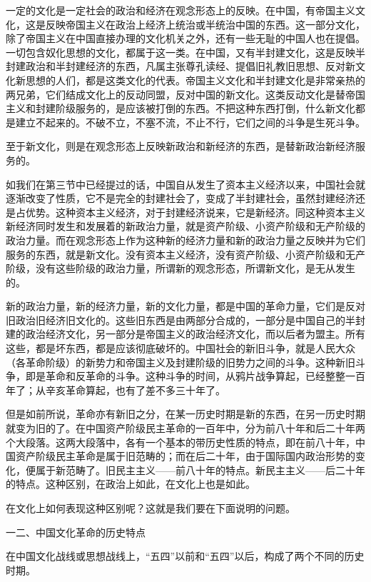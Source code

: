 \documentclass[UTF8, 12pt, a4paper]{ctexrep}
\begin{document}
一定的文化是一定社会的政治和经济在观念形态上的反映。在中国，有帝国主义文化，这是反映帝国主义在政治上经济上统治或半统治中国的东西。这一部分文化，除了帝国主义在中国直接办理的文化机关之外，还有一些无耻的中国人也在提倡。一切包含奴化思想的文化，都属于这一类。在中国，又有半封建文化，这是反映半封建政治和半封建经济的东西，凡属主张尊孔读经、提倡旧礼教旧思想、反对新文化新思想的人们，都是这类文化的代表。帝国主义文化和半封建文化是非常亲热的两兄弟，它们结成文化上的反动同盟，反对中国的新文化。这类反动文化是替帝国主义和封建阶级服务的，是应该被打倒的东西。不把这种东西打倒，什么新文化都是建立不起来的。不破不立，不塞不流，不止不行，它们之间的斗争是生死斗争。

至于新文化，则是在观念形态上反映新政治和新经济的东西，是替新政治新经济服务的。

如我们在第三节中已经提过的话，中国自从发生了资本主义经济以来，中国社会就逐渐改变了性质，它不是完全的封建社会了，变成了半封建社会，虽然封建经济还是占优势。这种资本主义经济，对于封建经济说来，它是新经济。同这种资本主义新经济同时发生和发展着的新政治力量，就是资产阶级、小资产阶级和无产阶级的政治力量。而在观念形态上作为这种新的经济力量和新的政治力量之反映并为它们服务的东西，就是新文化。没有资本主义经济，没有资产阶级、小资产阶级和无产阶级，没有这些阶级的政治力量，所谓新的观念形态，所谓新文化，是无从发生的。

新的政治力量，新的经济力量，新的文化力量，都是中国的革命力量，它们是反对旧政治旧经济旧文化的。这些旧东西是由两部分合成的，一部分是中国自己的半封建的政治经济文化，另一部分是帝国主义的政治经济文化，而以后者为盟主。所有这些，都是坏东西，都是应该彻底破坏的。中国社会的新旧斗争，就是人民大众（各革命阶级）的新势力和帝国主义及封建阶级的旧势力之间的斗争。这种新旧斗争，即是革命和反革命的斗争。这种斗争的时间，从鸦片战争算起，已经整整一百年了；从辛亥革命算起，也有了差不多三十年了。

但是如前所说，革命亦有新旧之分，在某一历史时期是新的东西，在另一历史时期就变为旧的了。在中国资产阶级民主革命的一百年中，分为前八十年和后二十年两个大段落。这两大段落中，各有一个基本的带历史性质的特点，即在前八十年，中国资产阶级民主革命是属于旧范畴的；而在后二十年，由于国际国内政治形势的变化，便属于新范畴了。旧民主主义——前八十年的特点。新民主主义——后二十年的特点。这种区别，在政治上如此，在文化上也是如此。

在文化上如何表现这种区别呢？这就是我们要在下面说明的问题。

一二、中国文化革命的历史特点

在中国文化战线或思想战线上，“五四”以前和“五四”以后，构成了两个不同的历史时期。
\end{document}
